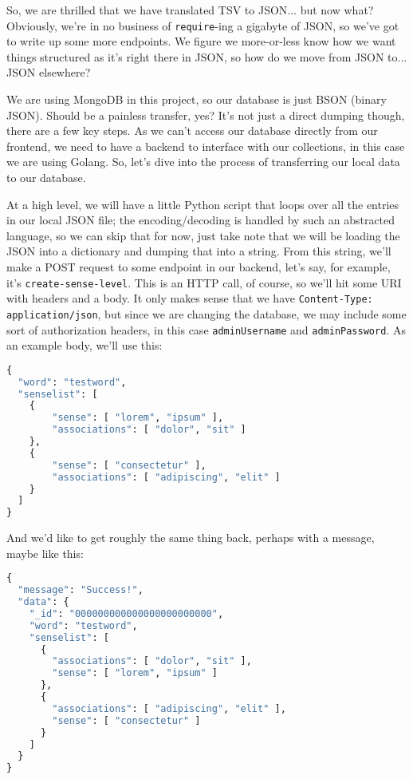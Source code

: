 \documentclass[11pt, twoside, reqno]{book}
\begin{document}
So, we are thrilled that we have translated TSV to JSON... but now what? Obviously, we're in no business of \texttt{require}-ing a gigabyte of JSON, so we've got to write up some more endpoints. We figure we more-or-less know how we want things structured as it's right there in JSON, so how do we move from JSON to... \textit{}JSON elsewhere\textit{}?

We are using MongoDB in this project, so our database is just BSON (binary JSON). Should be a painless transfer, yes? It's not just a direct dumping though, there are a few key steps. As we can't access our database directly from our frontend, we need to have a backend to interface with our collections, in this case we are using Golang. So, let's dive into the process of transferring our local data to our database.

At a high level, we will have a little Python script that loops over all the entries in our local JSON file; the encoding/decoding is handled by such an abstracted language, so we can skip that for now, just take note that we will be loading the JSON into a dictionary and dumping that into a string. From this string, we'll make a POST request to some endpoint in our backend, let's say, for example, it's  \texttt{create-sense-level}. This is an HTTP call, of course, so we'll hit some URI with headers and a body. It only makes sense that we have \texttt{Content-Type: application/json}, but since we are changing the database, we may include some sort of authorization headers, in this case \texttt{adminUsername} and \texttt{adminPassword}. As an example body, we'll use this:
\begin{lstlisting}[language=Python]
{
  "word": "testword",
  "senselist": [
  	{
  		"sense": [ "lorem", "ipsum" ],
  		"associations": [ "dolor", "sit" ]
  	},
  	{
  		"sense": [ "consectetur" ],
  		"associations": [ "adipiscing", "elit" ]
  	}
  ]
}
\end{lstlisting}

And we'd like to get roughly the same thing back, perhaps with a message, maybe like this:
\begin{lstlisting}[language=Python]
{
  "message": "Success!",
  "data": {
    "_id": "000000000000000000000000",
    "word": "testword",
    "senselist": [
      {
        "associations": [ "dolor", "sit" ],
        "sense": [ "lorem", "ipsum" ]
      },
      {
        "associations": [ "adipiscing", "elit" ],
        "sense": [ "consectetur" ]
      }
    ]
  }
}
\end{lstlisting}
\end{document}
